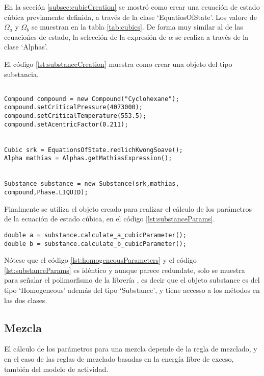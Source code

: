 En la sección \ref{subsec:cubicCreation} se mostró como crear una ecuación de estado cúbica previamente definida, a través de la clase `EquatiosOfState'. Los valore de $\Omega_a$ y $\Omega_b$ se muestran en la tabla \ref{tab:cubics}. De forma muy similar al de las ecuaciońes de estado, la selección de la expresión de $\alpha$ se realiza a través de la clase `Alphas'.

El código \ref{lst:substanceCreation} muestra como crear una objeto del tipo substancia.

\begin{lstlisting}[caption={Creación de un objeto tipo `Substance' para el compuesto Ciclohexano, con la ecuación de estado Soave Redlich Kwong y la expresión de $\alpha$ de mathias },label={lst:substanceCreation}]

Compound compound = new Compound("Cyclohexane");
compound.setCriticalPressure(4073000);
compound.setCriticalTemperature(553.5);
compound.setAcentricFactor(0.211);


Cubic srk = EquationsOfState.redlichKwongSoave();
Alpha mathias = Alphas.getMathiasExpression();


Substance substance = new Substance(srk,mathias, compound,Phase.LIQUID);
\end{lstlisting}

	Finalmente se utiliza el objeto creado para realizar el cálculo de los parámetros de la ecuación de estado cúbica, en el código \ref{lst:substanceParams}.

\begin{lstlisting}[caption={Cálculo de los parámetros para la ecuación de estado cúbica con la clase `Substance'.},label={lst:substanceParams}]
double a = substance.calculate_a_cubicParameter();
double b = substance.calculate_b_cubicParameter();
\end{lstlisting}
 

Nótese que el código \ref{lst:homogeneousParameters} y el código \ref{lst:substanceParams} es idéntico y aunque parece redundate, solo se muestra para señalar el polimorfismo de la librería , es decir que el objeto substance es del tipo `Homogeneous' además del tipo `Substance', y tiene accesso a los métodos en las dos clases.


\subsection{Mezcla}\label{subsec:mixture}

El cálculo de los parámetros para una mezcla depende de la regla de mezclado, y en el caso de las reglas de mezclado basadas en la energía libre de exceso, también del modelo de actividad.

